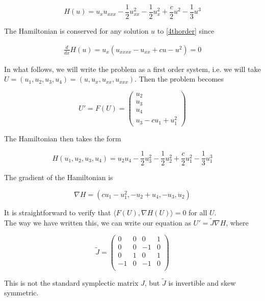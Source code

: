 \documentclass[12pt]{article}
\begin{document}
\begin{equation}\label{4thorderE}
H(u) = u_x u_{xxx} - \frac{1}{2}u_{xx}^2 - \frac{1}{2}u_x^2 + \frac{c}{2}u^2 - \frac{1}{3}u^3
\end{equation}

The Hamiltonian is conserved for any solution $u$ to \eqref{4thorder} since

\begin{align*}
\frac{d}{dx}H(u) = u_x(u_{xxxx} - u_{xx} + c u - u^2) = 0
\end{align*}

In what follows, we will write the problem as a first order system, i.e. we will take $U = (u_1, u_2, u_3, u_4) = (u, u_x, u_{xx}, u_{xxx})$. Then the problem becomes

\begin{equation}\label{4thordersystem}
U' = F(U) = \begin{pmatrix} 
u_2 \\ u_3 \\ u_4 \\ u_3 - c u_1 + u_1^2
\end{pmatrix}
\end{equation}

The Hamiltonian then takes the form

\begin{equation}
H(u_1, u_2, u_3, u_4) = u_2 u_4 - \frac{1}{2}u_3^2 - \frac{1}{2}u_2^2 + \frac{c}{2}u_1^2 - \frac{1}{3}u_1^3
\end{equation}

The gradient of the Hamiltonian is

\begin{equation}
\nabla H = (cu_1 - u_1^2, -u_2 + u_4, -u_3, u_2)
\end{equation}

It is straightforward to verify that $\langle F(U), \nabla H(U) \rangle = 0$ for all $U$.\\

The way we have written this, we can write our equation as $U' = \tilde{J} \nabla H$, where

\[
\tilde{J} = \begin{pmatrix}
0 & 0 & 0 & 1 \\
0 & 0 & -1 & 0 \\
0 & 1 & 0 & 1 \\
-1 & 0 & -1 & 0 \\
\end{pmatrix}
\]

This is not the standard symplectic matrix $J$, but $\tilde{J}$ is invertible and skew symmetric. \\
\end{document}
